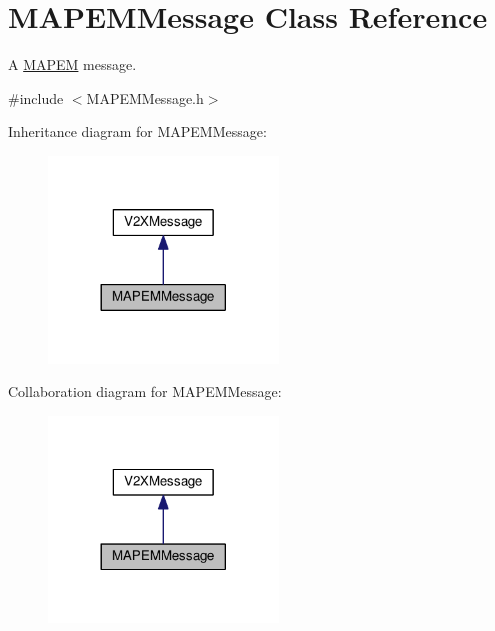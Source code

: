 \hypertarget{classMAPEMMessage}{}\section{M\+A\+P\+E\+M\+Message Class Reference}
\label{classMAPEMMessage}


A \hyperlink{structMAPEM}{M\+A\+P\+EM} message.  




{\ttfamily \#include $<$M\+A\+P\+E\+M\+Message.\+h$>$}



Inheritance diagram for M\+A\+P\+E\+M\+Message\+:\nopagebreak
\begin{figure}[H]
\begin{center}
\leavevmode
\includegraphics[width=173pt]{classMAPEMMessage__inherit__graph}
\end{center}
\end{figure}


Collaboration diagram for M\+A\+P\+E\+M\+Message\+:\nopagebreak
\begin{figure}[H]
\begin{center}
\leavevmode
\includegraphics[width=173pt]{classMAPEMMessage__coll__graph}
\end{center}
\end{figure}

